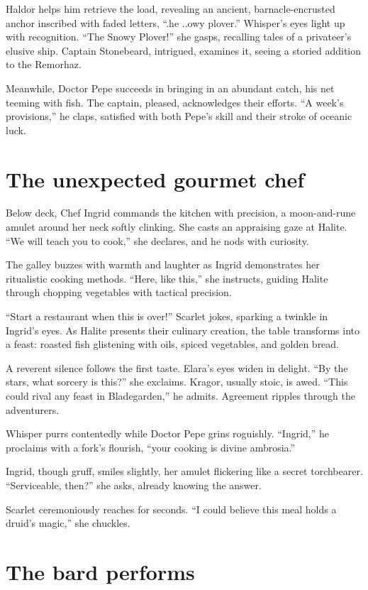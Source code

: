 \documentclass[
  letterpaper,12pt,twoside,twocolumn,openany,
  nodeprecatedcode,bg=full]{dndbook}
\begin{document}
Haldor helps him retrieve the load, revealing an ancient,
barnacle-encrusted anchor inscribed with faded letters, ``.he ..owy
plover.'' Whisper's eyes light up with recognition. ``The Snowy
Plover!'' she gasps, recalling tales of a privateer's elusive ship.
Captain Stonebeard, intrigued, examines it, seeing a storied addition to
the Remorhaz.

Meanwhile, Doctor Pepe succeeds in bringing in an abundant catch, his
net teeming with fish. The captain, pleased, acknowledges their efforts.
``A week's provisions,'' he claps, satisfied with both Pepe's skill and
their stroke of oceanic luck.

\section{The unexpected gourmet chef}\label{the-unexpected-gourmet-chef}

Below deck, Chef Ingrid commands the kitchen with precision, a
moon-and-rune amulet around her neck softly clinking. She casts an
appraising gaze at Halite. ``We will teach you to cook,'' she declares,
and he nods with curiosity.

The galley buzzes with warmth and laughter as Ingrid demonstrates her
ritualistic cooking methods. ``Here, like this,'' she instructs, guiding
Halite through chopping vegetables with tactical precision.

``Start a restaurant when this is over!'' Scarlet jokes, sparking a
twinkle in Ingrid's eyes. As Halite presents their culinary creation,
the table transforms into a feast: roasted fish glistening with oils,
spiced vegetables, and golden bread.

A reverent silence follows the first taste. Elara's eyes widen in
delight. ``By the stars, what sorcery is this?'' she exclaims. Kragor,
usually stoic, is awed. ``This could rival any feast in Bladegarden,''
he admits. Agreement ripples through the adventurers.

Whisper purrs contentedly while Doctor Pepe grins roguishly. ``Ingrid,''
he proclaims with a fork's flourish, ``your cooking is divine
ambrosia.''

Ingrid, though gruff, smiles slightly, her amulet flickering like a
secret torchbearer. ``Serviceable, then?'' she asks, already knowing the
answer.

Scarlet ceremoniously reaches for seconds. ``I could believe this meal
holds a druid's magic,'' she chuckles.

\section{The bard performs}\label{the-bard-performs}
\end{document}
